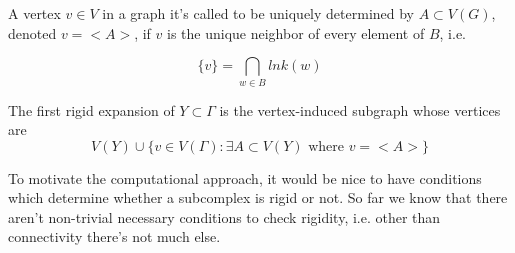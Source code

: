 A vertex $v \in V$ in a graph it's called to be uniquely determined by $A\subset V(G)$, denoted $v=<A>$, if $v$ is the unique neighbor of every element of $B$, i.e.

$$ \{ v \} = \bigcap_{w\in B} lnk(w) $$

\begin{defini}
The first rigid expansion of $Y\subset \Gamma$ is the vertex-induced subgraph whose vertices are
$$ V(Y) \cup \{ v\in V(\Gamma) :  \exists A \subset V(Y) \text{ where } v = <A>  \}$$
\end{defini}

To motivate the computational approach, it would be nice to have conditions which determine whether a subcomplex is rigid or not. So far we know that there aren't non-trivial necessary conditions to check rigidity, i.e. other than connectivity there's not much else.